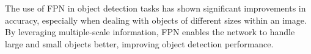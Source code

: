 \vspace{\baselineskip}

\noindent The use of FPN in object detection tasks has shown significant improvements in accuracy, especially when dealing with objects of different sizes within an image. By leveraging multiple-scale information, FPN enables the network to handle large and small objects better, improving object detection performance.



